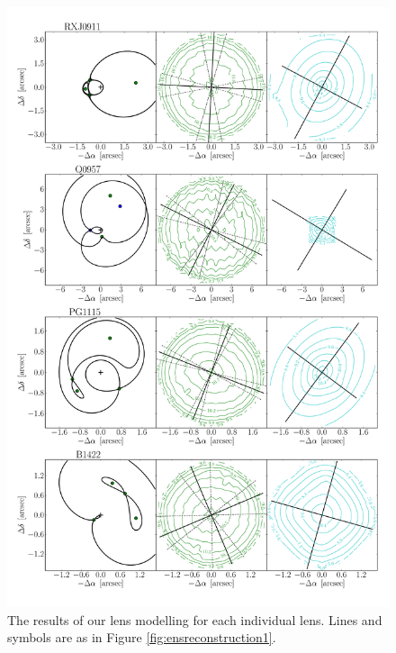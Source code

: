 \documentclass[useAMS,usenatbib]{mn2e}
\begin{document}
\begin{figure}
  \centering
  \includegraphics[width=.8\linewidth]{Figures/AllLenses32.pdf}
  \caption[width=.65\linewidth]{The results of our lens modelling for each individual lens. Lines and symbols are as in Figure \ref{fig:ensreconstruction1}.}
  \label{fig:lensreconstruction2}
\end{figure}
\end{document}
